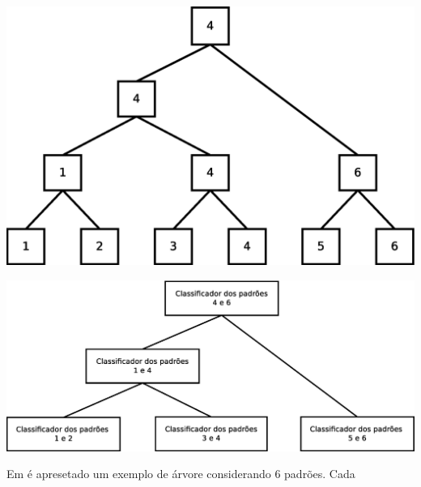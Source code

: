 \begin{center}
	\includegraphics[scale=0.4]{graficos/ArvTorneio1}
	\label{img:ArvTorneio1}
\end{center}

\begin{center}
	\includegraphics[scale=0.4]{graficos/ArvTorneio2}
	\label{img:ArvTorneio2}
\end{center}


Em  é apresetado um exemplo de árvore considerando 6 padrões. Cada 
